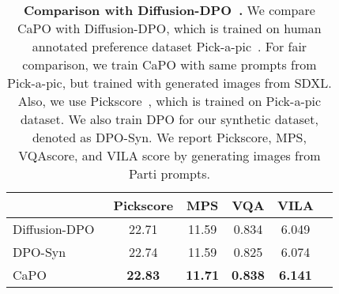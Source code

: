 \begin{table}[t]
\centering
\small
\vspace{-0.1in}
\centering\small

\begin{tabular}{l  ccccc}
\toprule
 & Pickscore & MPS & VQA & VILA\\
\midrule
Diffusion-DPO~\citep{wallace2023diffusion} & 22.71 & 11.59 & 0.834 & 6.049 \\
DPO-Syn  & 22.74 & 11.59 & 0.825 & 6.074 \\
CaPO  & {\bf 22.83} & {\bf 11.71} & {\bf 0.838} & {\bf 6.141}\\
\bottomrule
\end{tabular}
\vspace{-2mm}
\caption{
\textbf{Comparison with Diffusion-DPO~\citep{wallace2023diffusion}.} 
We compare CaPO with Diffusion-DPO, which is trained on human annotated preference dataset Pick-a-pic~\citep{kirstain2023pick}. 
For fair comparison, we train CaPO with same prompts from Pick-a-pic, but trained with generated images from SDXL. Also, we use Pickscore~\citep{kirstain2023pick}, which is trained on Pick-a-pic dataset. We also train DPO for our synthetic dataset, denoted as DPO-Syn.
We report Pickscore, MPS, VQAscore, and VILA score by generating images from Parti prompts. 
}\label{tab:dpo_comp}
\vspace{-0.05in}
\end{table}

